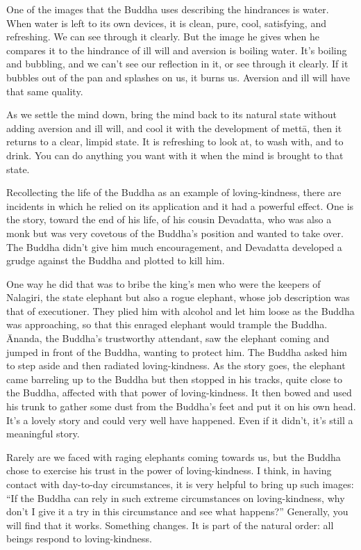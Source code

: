 One of the images that the Buddha uses describing the hindrances is
water. When water is left to its own devices, it is clean, pure, cool,
satisfying, and refreshing. We can see through it clearly. But the image
he gives when he compares it to the hindrance of ill will and aversion
is boiling water. It’s boiling and bubbling, and we can’t see our
reflection in it, or see through it clearly. If it bubbles out of the
pan and splashes on us, it burns us. Aversion and ill will have that
same quality.

As we settle the mind down, bring the mind back to its natural state
without adding aversion and ill will, and cool it with the development
of mettā, then it returns to a clear, limpid state. It is refreshing to
look at, to wash with, and to drink. You can do anything you want with
it when the mind is brought to that state.

Recollecting the life of the Buddha as an example of loving-kindness,
there are incidents in which he relied on its application and it had a
powerful effect. One is the story, toward the end of his life, of his
cousin Devadatta, who was also a monk but was very covetous of the
Buddha’s position and wanted to take over. The Buddha didn’t give him
much encouragement, and Devadatta developed a grudge against the Buddha
and plotted to kill him.

One way he did that was to bribe the king’s men who were the keepers of
Nalagiri, the state elephant but also a rogue elephant, whose job
description was that of executioner. They plied him with alcohol and let
him loose as the Buddha was approaching, so that this enraged elephant
would trample the Buddha. Ānanda, the Buddha’s trustworthy attendant,
saw the elephant coming and jumped in front of the Buddha, wanting to
protect him. The Buddha asked him to step aside and then radiated
loving-kindness. As the story goes, the elephant came barreling up to
the Buddha but then stopped in his tracks, quite close to the Buddha,
affected with that power of loving-kindness. It then bowed and used his
trunk to gather some dust from the Buddha’s feet and put it on his own
head. It’s a lovely story and could very well have happened. Even if it
didn’t, it’s still a meaningful story.

Rarely are we faced with raging elephants coming towards us, but the
Buddha chose to exercise his trust in the power of loving-kindness. I
think, in having contact with day-to-day circumstances, it is very
helpful to bring up such images: “If the Buddha can rely in such extreme
circumstances on loving-kindness, why don’t I give it a try in this
circumstance and see what happens?” Generally, you will find that it
works. Something changes. It is part of the natural order: all beings
respond to loving-kindness.

